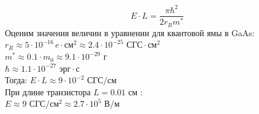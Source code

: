 \documentclass[12pt,oneside]{book}
\begin{document}
{{\begin{equation}
		\label{pi}
		{E}\cdot{L} = \frac{{\pi}{\hbar}^2}{2{r_R}{m^*}}
	\end{equation}
	Оценим значения величин в уравнении для квантовой ямы в GaAs: \\
	$r_R\approx{5}\cdot{10}^{-16} \,e\cdot\text{см}^2\approx{2.4}\cdot{10}^{-25}\text{ СГС}\cdot\text{см}^2$ \\
	$m^* \approx {0.1}\cdot{m_0}\approx{9.1}\cdot{10}^{-29}\text{ г}$ \\
	${\hbar}\approx{1.1}\cdot{10}^{-27}\text{ эрг}\cdot\text{с}$ \\
	Тогда: ${E}\cdot{L}\approx{9}\cdot{10}^{-2}\text{ СГС}/\text{см}$ \\
	При длине транзистора ${L = 0.01}$ см : \\
	$E\approx{9}\text{ СГС}/\text{см}^2\approx{2.7}\cdot{10}^{5}\text{ В}/\text{м}$
	

}}
\end{document}
